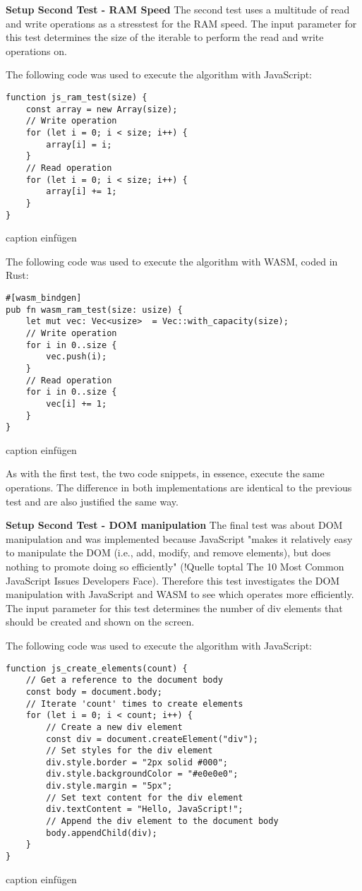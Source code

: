 \textbf{Setup Second Test - RAM Speed} \newline
The second test uses a multitude of read and write operations as a stresstest for the RAM speed. The input parameter for this test determines the size of the iterable to perform the read and write operations on.

The following code was used to execute the algorithm with JavaScript:
\begin{verbatim}
function js_ram_test(size) {
    const array = new Array(size);
    // Write operation
    for (let i = 0; i < size; i++) {
        array[i] = i;
    }
    // Read operation
    for (let i = 0; i < size; i++) {
        array[i] += 1;
    }
}
\end{verbatim}
caption einfügen

The following code was used to execute the algorithm with WASM, coded in Rust:
\begin{verbatim}
#[wasm_bindgen]
pub fn wasm_ram_test(size: usize) {
    let mut vec: Vec<usize>  = Vec::with_capacity(size);
    // Write operation
    for i in 0..size {
        vec.push(i);
    }
    // Read operation
    for i in 0..size {
        vec[i] += 1;
    }
}
\end{verbatim}
caption einfügen

As with the first test, the two code snippets, in essence, execute the same operations. The difference in both implementations are identical to the previous test and are also justified the same way. 

\textbf{Setup Second Test - DOM manipulation} \newline
The final test was about DOM manipulation and was implemented because JavaScript "makes it relatively easy to manipulate the DOM (i.e., add, modify, and remove elements), but does nothing to promote doing so efficiently" (!Quelle toptal The 10 Most Common JavaScript Issues Developers Face). Therefore this test investigates the DOM manipulation with JavaScript and WASM to see which operates more efficiently. The input parameter for this test determines the number of div elements that should be created and shown on the screen.

The following code was used to execute the algorithm with JavaScript:
\begin{verbatim}
function js_create_elements(count) {
    // Get a reference to the document body
    const body = document.body;
    // Iterate 'count' times to create elements
    for (let i = 0; i < count; i++) {
        // Create a new div element
        const div = document.createElement("div");
        // Set styles for the div element
        div.style.border = "2px solid #000";
        div.style.backgroundColor = "#e0e0e0";
        div.style.margin = "5px";
        // Set text content for the div element
        div.textContent = "Hello, JavaScript!";
        // Append the div element to the document body
        body.appendChild(div);
    }
}
\end{verbatim}
caption einfügen

